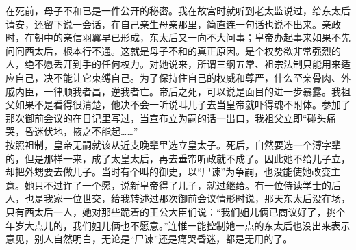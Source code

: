 在死前，母子不和已是一件公开的秘密。我在故宫时就听到老太监说过，给东太后请安，还留下说一会话，在自己亲生母亲那里，简直连一句话也说不出来。亲政时，在朝中的亲信羽翼早已形成，东太后又一向不大问事；皇帝办起事来如果不先问问西太后，根本行不通。这就是母子不和的真正原因。是个权势欲非常强烈的人，绝不愿丢开到手的任何权力。对她说来，所谓三纲五常、祖宗法制只能用来适应自己，决不能让它束缚自己。为了保持住自己的权威和尊严，什么至亲骨肉、外戚内臣，一律顺我者昌，逆我者亡。帝后之死，可以说是面目的进一步暴露。我祖父如果不是看得很清楚，他决不会一听说叫儿子去当皇帝就吓得魂不附体。参加了那次御前会议的在日记里写过，当宣布立为嗣的话一出口，我祖父立即“碰头痛哭，昏迷伏地，掖之不能起……”\\

按照祖制，皇帝无嗣就该从近支晚辈里选立皇太子。死后，自然要选一个溥字辈的，但是那样一来，成了太皇太后，再去垂帘听政就不成了。因此她不给儿子立，却把外甥要去做儿子。当时有个叫的御史，以“尸谏”为争嗣，也没能使她改变主意。她只不过许了一个愿，说新皇帝得了儿子，就过继给。有一位侍读学士的后人，也是我家一位世交，给我转述过那次御前会议情形时说，那天东太后没在场，只有西太后一人，她对那些跪着的王公大臣们说：“我们姐儿俩已商议好了，挑个年岁大点儿的，我们姐儿俩也不愿意。”连惟一能控制她一点的东太后也没出来表示意见，别人自然明白，无论是“尸谏”还是痛哭昏迷，都是无用的了。\\

